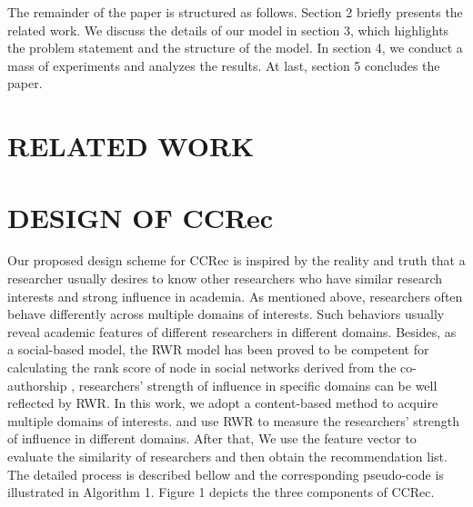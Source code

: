 \documentclass{acm_proc_article-sp}
\begin{document}
The remainder of the paper is structured as follows. Section 2 briefly presents the related work. We discuss the details of our model in section 3, which highlights the problem statement and the structure of the model. In section 4, we conduct a mass of experiments and analyzes the results. At last, section 5 concludes the paper.
\section{RELATED WORK}


\section{DESIGN OF CCRec}
Our proposed design scheme for CCRec is inspired by the reality and truth that a researcher usually desires to know other researchers who have similar research interests and strong influence in academia. As mentioned above, researchers often behave differently across multiple domains of interests. Such behaviors usually reveal academic features of different researchers in different domains. Besides, as a social-based model, the RWR model has been proved to be competent for calculating the rank score of node in social networks derived from the co-authorship \cite{li2014acrec}, researchers' strength of influence in specific domains can be well reflected by RWR. In this work, we adopt a content-based method to acquire multiple domains of interests. and use RWR to measure the researchers' strength of influence in different domains. After that, We use the feature vector to evaluate the similarity of researchers and then obtain the recommendation list. The detailed process is described bellow and the corresponding pseudo-code is illustrated in Algorithm 1. Figure 1 depicts the three components of CCRec.


\end{document}
